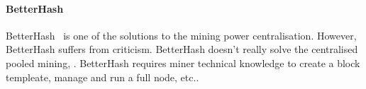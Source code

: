 



\paragraph{BetterHash}
BetterHash~\cite{draft-bip-BetterHash} is one of the solutions to the mining power centralisation.
However, BetterHash suffers from criticism.
BetterHash doesn't really solve the centralised pooled mining, .
BetterHash requires miner technical knowledge to create a block templeate, manage and run a full node, etc..
